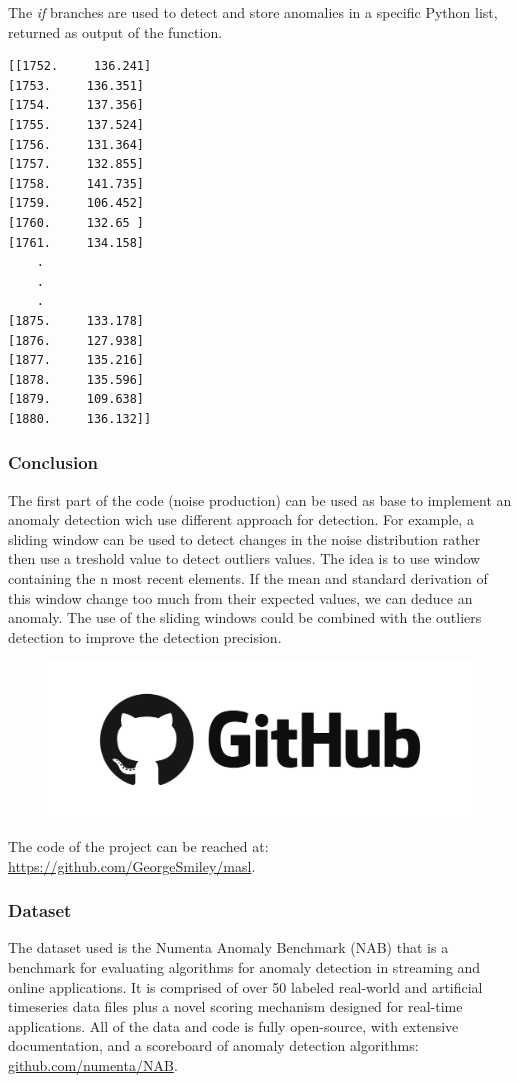\documentclass[12pt]{article}
\begin{document}
			The \textit{if} branches are used to detect and store anomalies in a specific Python list, returned as output of the function. 
			
			\begin{lstlisting}
[[1752.     136.241]
[1753.     136.351]
[1754.     137.356]
[1755.     137.524]
[1756.     131.364]
[1757.     132.855]
[1758.     141.735]
[1759.     106.452]
[1760.     132.65 ]
[1761.     134.158]
	.
	.
	.
[1875.     133.178]
[1876.     127.938]
[1877.     135.216]
[1878.     135.596]
[1879.     109.638]
[1880.     136.132]]
			\end{lstlisting}
			
		\subsubsection{Conclusion}
			The first part of the code (noise production) can be used as base to implement an anomaly detection wich use different approach for detection. For example, a sliding window can be used to detect changes in the noise distribution rather then use a treshold value to detect outliers values. The idea is to use window containing the n most recent elements. If the mean and standard derivation of this window change too much from their expected values, we can deduce an anomaly. The use of the sliding windows could be combined with the outliers detection to improve the detection precision.
			
			\begin{figure}[h!]
				\centering
				\includegraphics[scale=0.08]{img/github.png}
			\end{figure}
			The code of the project can be reached at: \href{https://github.com/GeorgeSmiley/masl}{https://github.com/GeorgeSmiley/masl}.
		\subsubsection{Dataset}
		
			The dataset used is the Numenta Anomaly Benchmark (NAB) that is a benchmark for evaluating algorithms for anomaly detection in streaming and online applications. It is comprised of over 50 labeled real-world and artificial timeseries data files plus a novel scoring mechanism designed for real-time applications. All of the data and code is fully open-source, with extensive documentation, and a scoreboard of anomaly detection algorithms: \href{github.com/numenta/NAB}{github.com/numenta/NAB}.
			
\end{document}
